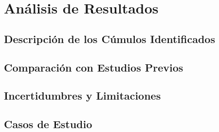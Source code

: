 \documentclass[../Main.tex]{subfiles}
\begin{document}
\section{Análisis de Resultados}

\subsection{Descripción de los Cúmulos Identificados}
\lipsum[1] %

\subsection{Comparación con Estudios Previos}
\lipsum[2] %

\subsection{Incertidumbres y Limitaciones}
\lipsum[3] %

\subsection{Casos de Estudio}
\lipsum[4] %

\biblio
\end{document}
